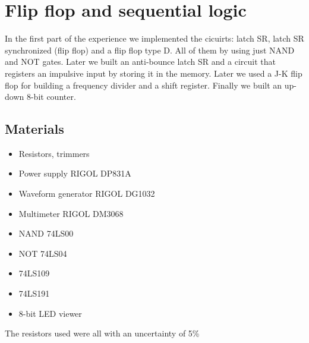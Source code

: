 \chapter{Flip flop and sequential logic}
In the first part of the experience we implemented the cicuirts: latch SR, latch SR synchronized (flip flop) and a flip flop type D. All of them by using just NAND and NOT gates. Later we built an anti-bounce latch SR and a circuit that registers an impulsive input by storing it in the memory. Later we used a J-K flip flop for building a frequency divider and a shift register. Finally we built an up-down 8-bit counter.

\section{Materials}
\begin{itemize}
\item Resistors, trimmers
\item Power supply RIGOL DP831A
\item Waveform generator RIGOL DG1032
\item Multimeter RIGOL DM3068
\item NAND 74LS00
\item NOT 74LS04
\item 74LS109
\item 74LS191
\item 8-bit LED viewer
\end{itemize}
The resistors used were all with an uncertainty of 5\%

